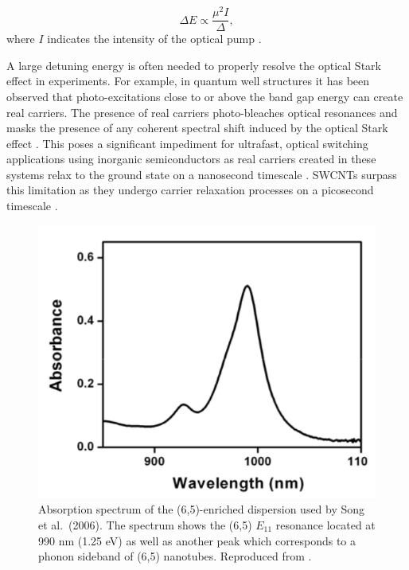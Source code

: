 
\begin{equation}
		\Delta E \propto \frac{\mu^2 I}{\Delta},
\end{equation}
where $I$ indicates the intensity of the optical pump \cite{combescot1992semiconductors}.

A large detuning energy is often needed to properly resolve the optical Stark effect in experiments. For example, in quantum well structures it has been observed that photo-excitations close to or above the band gap energy can create real carriers. The presence of real carriers photo-bleaches optical resonances and masks the presence of any coherent spectral shift induced by the optical Stark effect \cite{peyghambarian1984blue}. This poses a significant impediment for ultrafast, optical switching applications using inorganic semiconductors as real carriers created in these systems relax to the ground state on a nanosecond timescale \cite{maeda2006gigantic}. SWCNTs surpass this limitation as they undergo carrier relaxation processes on a picosecond timescale \cite{ostojic2004interband, wang2004observation, manzoni2005intersubband, maeda2006gigantic}.

\begin{figure}[ht]
	\centering
	\includegraphics[scale=0.5]{images/chapter_prior_works/absorption_spectrum_song_2006}
	\caption{Absorption spectrum of the (6,5)-enriched dispersion used by Song et al.\ (2006). The spectrum shows the (6,5) $E_{11}$ resonance located at 990 nm (1.25 eV) as well as another peak which corresponds to a phonon sideband of (6,5) nanotubes. Reproduced from \cite{song2006optical}.}
	\label{fig:abs_song_2006}
\end{figure}

